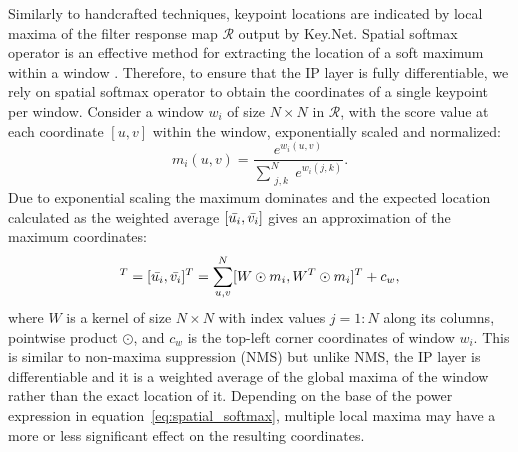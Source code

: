  Similarly to handcrafted techniques, keypoint locations are indicated by local maxima of the filter response map $\mathcal{R}$ output by Key.Net. Spatial softmax operator is an effective method for extracting the location of a soft maximum within a window \cite{LIFT, keypointnet_nips_18, OnoSerra18, detone2017superpoint}. Therefore, to ensure that the IP layer is fully differentiable, we rely on spatial softmax operator to obtain the coordinates of a single keypoint per window. Consider a window $w_i$ of size $N \times N$ in $\mathcal{R}$,
with the score value at each coordinate $[u,v]$ within the window, exponentially scaled and normalized: 
\begin{equation}
m_{i}(u,v) = \dfrac{e^{w_i(u, v)}}{\sum_{\substack{j, k}}^{N} e^{w_i(j, k)}}.
\label{eq:spatial_softmax}
\end{equation}
Due to exponential scaling the maximum dominates and the expected location calculated as the weighted average $[\Bar{u_i},\Bar{v_i}]$ gives an approximation of the maximum coordinates:
\begin{equation}
[x_i,y_i]^{T}=[\Bar{u_i}, \Bar{v_i}]^{T} =\sum_{\substack{u, v}}^{N} [W \odot m_{i}, W^T \odot m_{i}]^{T} + c_{w},
\label{eq:Index_Proposal}
\end{equation}
where $W$ is a kernel of size $N \times N$ with index values $j=1:N$ along its columns, pointwise product $\odot$, and $c_{w}$ is the top-left corner coordinates of window $w_{i}$.
This is similar to non-maxima suppression (NMS) but unlike NMS, the IP layer is differentiable and it is a weighted average of the global maxima of the window rather than the exact location of it.
Depending on the base of the power expression in equation~\ref{eq:spatial_softmax}, multiple local maxima may have a more or less significant effect on the resulting coordinates.  

